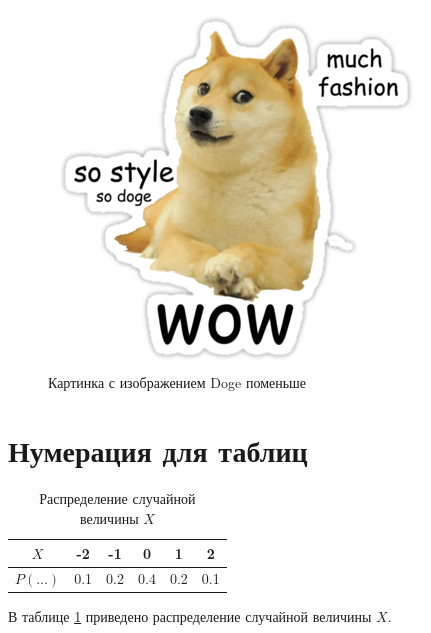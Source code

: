 \documentclass[12pt, a4paper]{article}  %
\begin{document}
\begin{figure}[H]
	\caption{Картинка с изображением Doge поменьше}
	\begin{center}
		\includegraphics[width=0.1\textheight]{doge.png}
	\end{center}
\end{figure}


\section{Нумерация для таблиц}

\begin{table}[H]
	\begin{center}
		\begin{tabular}{|c|c|c|c|c|c|}
			\hline
			$X$ & -2 & -1 & 0 & 1 & 2 \\
			\hline
			$P(\ldots)$ & 0.1 & 0.2 & 0.4 & 0.2 & 0.1 \\
			\hline
		\end{tabular}
	\caption{Распределение случайной величины $X$}\label{tab:random}
	\end{center}
\end{table}

В таблице \ref{tab:random} приведено распределение случайной величины $X$.
\end{document}
